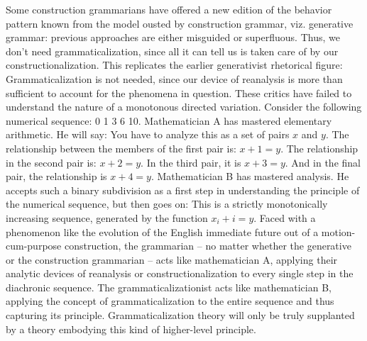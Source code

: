 Some construction grammarians have offered a new edition of the behavior pattern known from the model ousted by construction grammar, viz. generative grammar: previous approaches are either misguided or superfluous. Thus, we don’t need grammaticalization, since all it can tell us is taken care of by our constructionalization. This replicates the earlier generativist rhetorical figure: Grammaticalization is not needed, since our device of reanalysis is more than sufficient to account for the phenomena in question. These critics have failed to understand the nature of a monotonous directed variation. Consider the following numerical sequence: 0 1 3 6 10. Mathematician A has mastered elementary arithmetic. He will say: You have to analyze this as a set of pairs $x$ and $y$. The relationship between the members of the first pair is: $x+1=y$. The relationship in the second pair is: $x+2=y$. In the third pair, it is $x+3=y$. And in the final pair, the relationship is $x+4=y$. Mathematician B has mastered analysis. He accepts such a binary subdivision as a first step in understanding the principle of the numerical sequence, but then goes on: This is a strictly monotonically increasing sequence, generated by the function $x_i+i=y$. Faced with a phenomenon like the evolution of the English immediate future out of a motion-cum-purpose construction, the grammarian – no matter whether the generative or the construction grammarian – acts like mathematician A, applying their analytic devices of reanalysis or constructionalization to every single step in the diachronic sequence. The grammaticalizationist acts like mathematician B, applying the concept of grammaticalization to the entire sequence and thus capturing its principle. Grammaticalization theory will only be truly supplanted by a theory embodying this kind of higher-level principle.
